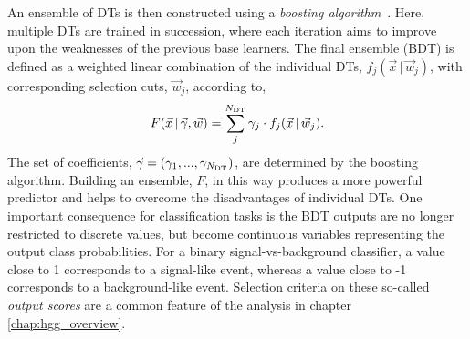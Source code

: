 An ensemble of DTs is then constructed using a \textit{boosting algorithm}~\cite{10.1214/aos/1024691079,10.1214/aos/1013203451}. Here, multiple DTs are trained in succession, where each iteration aims to improve upon the weaknesses of the previous base learners. The final ensemble (BDT) is defined as a weighted linear combination of the individual DTs, $f_j(\vec{x}\,|\,\vec{w}_j)$, with corresponding selection cuts, $\vec{w}_j$, according to,
\begin{equation}
    F(\vec{x}\,|\,\vec{\gamma},\vec{w}) = \sum^{N_{\rm{DT}}}_j \gamma_j \cdot f_j(\vec{x}\,|\,\vec{w}_j).
\end{equation}
\noindent
The set of coefficients, $\vec{\gamma} = (\gamma_1,...,\gamma_{N_{\rm{DT}}})$, are determined by the boosting algorithm. Building an ensemble, $F$, in this way produces a more powerful predictor and helps to overcome the disadvantages of individual DTs. One important consequence for classification tasks is the BDT outputs are no longer restricted to discrete values, but become continuous variables representing the output class probabilities. For a binary signal-vs-background classifier, a value close to 1 corresponds to a signal-like event, whereas a value close to -1 corresponds to a background-like event. Selection criteria on these so-called \textit{output scores} are a common feature of the \Hgg analysis in chapter \ref{chap:hgg_overview}. 